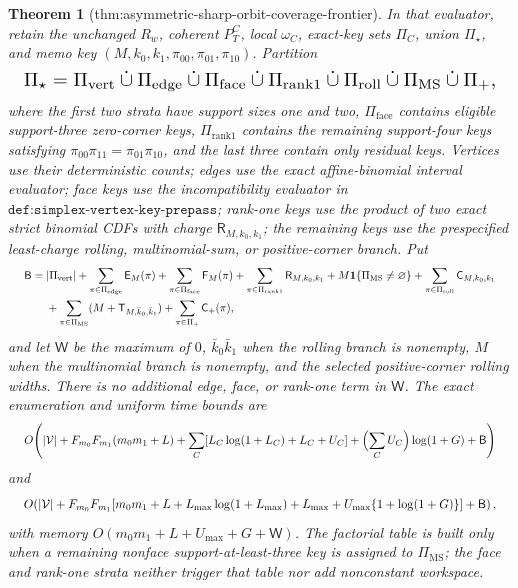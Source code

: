 \documentclass{article}
\newtheorem{theorem}{Theorem}
\begin{document}
\begin{theorem}[thm:asymmetric-sharp-orbit-coverage-frontier]
In that evaluator, retain the unchanged \(R_w\), coherent \(P_T^C\), local \(\omega_C\), exact-key sets \(\Pi_C\), union \(\Pi_\star\), and memo key \((M,k_0,k_1,\pi_{00},\pi_{01},\pi_{10})\). Partition
\[
\makebox[\linewidth][c]{\resizebox{0.98\linewidth}{!}{\(\displaystyle \Pi_\star=\Pi_{\mathrm{vert}}\mathbin{\dot\cup}\Pi_{\mathrm{edge}}
\mathbin{\dot\cup}\Pi_{\mathrm{face}}\mathbin{\dot\cup}
\Pi_{\mathrm{rank1}}\mathbin{\dot\cup}
\Pi_{\mathrm{roll}}\mathbin{\dot\cup}
\Pi_{\mathrm{MS}}\mathbin{\dot\cup}\Pi_+,\)}}
\]
where the first two strata have support sizes one and two, \(\Pi_{\mathrm{face}}\) contains eligible support-three zero-corner keys, \(\Pi_{\mathrm{rank1}}\) contains the remaining support-four keys satisfying \(\pi_{00}\pi_{11}=\pi_{01}\pi_{10}\), and the last three contain only residual keys. Vertices use their deterministic counts; edges use the exact affine-binomial interval evaluator; face keys use the incompatibility evaluator in \(\texttt{def:simplex-vertex-key-prepass}\); rank-one keys use the product of two exact strict binomial CDFs with charge \(\mathsf R_{M,k_0,k_1}\); the remaining keys use the prespecified least-charge rolling, multinomial-sum, or positive-corner branch. Put
\[
\makebox[\linewidth][c]{\resizebox{0.98\linewidth}{!}{\(\displaystyle \begin{aligned}
\mathsf B={}&|\Pi_{\mathrm{vert}}|
+\sum_{\pi\in\Pi_{\mathrm{edge}}}\mathsf E_M(\pi)
+\sum_{\pi\in\Pi_{\mathrm{face}}}\mathsf F_M(\pi)
+\sum_{\pi\in\Pi_{\mathrm{rank1}}}\mathsf R_{M,k_0,k_1}
+M\mathbf 1\{\Pi_{\mathrm{MS}}\ne\varnothing\}
+\sum_{\pi\in\Pi_{\mathrm{roll}}}\mathsf C_{M,k_0,k_1}\\
&+\sum_{\pi\in\Pi_{\mathrm{MS}}}
(M+\mathsf T_{M,\bar k_0,\bar k_1})
+\sum_{\pi\in\Pi_+}\mathsf C_+(\pi),
\end{aligned}\)}}
\]
and let \(\mathsf W\) be the maximum of \(0\), \(\bar k_0\bar k_1\) when the rolling branch is nonempty, \(M\) when the multinomial branch is nonempty, and the selected positive-corner rolling widths. There is no additional edge, face, or rank-one term in \(\mathsf W\). The exact enumeration and uniform time bounds are
\[
\makebox[\linewidth][c]{\resizebox{0.98\linewidth}{!}{\(\displaystyle O\!\left(
|\mathcal V|+F_{m_0}F_{m_1}(m_0m_1+L)
+\sum_C[L_C\log(1+L_C)+L_C+U_C]
+\Bigl(\sum_CU_C\Bigr)\log(1+G)+\mathsf B
\right)\)}}
\]
and
\[
\makebox[\linewidth][c]{\resizebox{0.98\linewidth}{!}{\(\displaystyle O\!\left(
|\mathcal V|+F_{m_0}F_{m_1}
[m_0m_1+L+L_{\max}\log(1+L_{\max})+L_{\max}
+U_{\max}\{1+\log(1+G)\}]
+\mathsf B
\right),\)}}
\]
with memory \(O(m_0m_1+L+U_{\max}+G+\mathsf W)\). The factorial table is built only when a remaining nonface support-at-least-three key is assigned to \(\Pi_{\mathrm{MS}}\); the face and rank-one strata neither trigger that table nor add nonconstant workspace.


\end{theorem}
\end{document}
